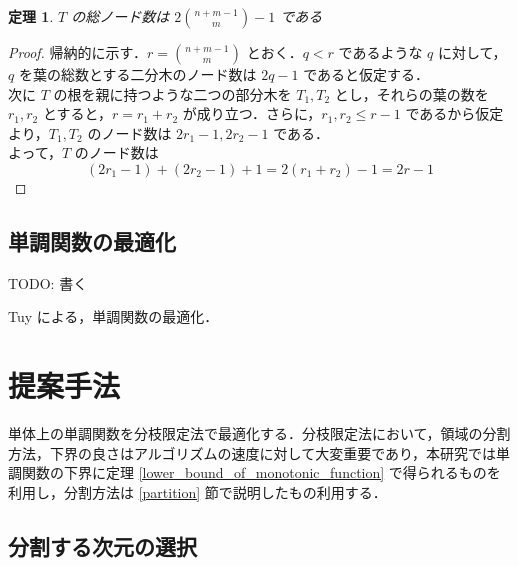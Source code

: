\documentclass[a4paper,11pt]{jreport}
\newtheorem{theorem}{定理}
\begin{document}
\begin{theorem}
$ T $ の総ノード数は $ 2 \binom{n + m - 1}{m} - 1 $ である
\end{theorem}
\begin{proof}
帰納的に示す．$ r = \binom{n + m - 1}{m} $ とおく．$ q < r $ であるような $ q $ に対して，$ q $ を葉の総数とする二分木のノード数は $ 2q - 1 $ であると仮定する．\\
次に $ T $ の根を親に持つような二つの部分木を $ T_1, T_2 $ とし，それらの葉の数を $ r_1, r_2 $ とすると，$ r = r_1 + r_2 $ が成り立つ．さらに，$ r_1, r_2 \leq r - 1 $ であるから仮定より，$ T_1, T_2 $ のノード数は $ 2r_1 - 1, 2r_2 - 1 $ である．\\
よって，$ T $ のノード数は
$$ (2r_1 - 1) + (2r_2 - 1) + 1 = 2(r_1 + r_2) - 1 = 2r - 1 $$
\end{proof}

\section{単調関数の最適化}

TODO: 書く\par
Tuy による，単調関数の最適化．\par

\chapter{提案手法}

単体上の単調関数を分枝限定法で最適化する．分枝限定法において，領域の分割方法，下界の良さはアルゴリズムの速度に対して大変重要であり，本研究では単調関数の下界に定理  \ref{lower_bound_of_monotonic_function} で得られるものを利用し，分割方法は \ref{partition} 節で説明したもの利用する．\par

\section{分割する次元の選択}
\end{document}
